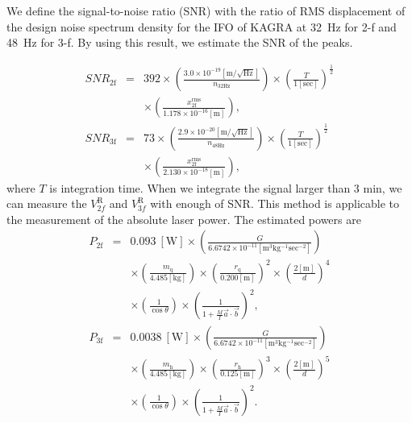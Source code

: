 \documentclass[%
 reprint,
superscriptaddress,
 amsmath,amssymb,
 aps,
]{revtex4-1}
\begin{document}
We define the signal-to-noise ratio (SNR) with the ratio of RMS displacement of the design noise spectrum density for the IFO of KAGRA at 32~Hz for 2-f and 48~Hz for 3-f.
By using this result, we estimate the SNR of the peaks.

\footnotesize
\begin{eqnarray}
\!S\!N\!R_{\mathrm{2f}}&=&392 \times \left(\frac{3.0 \times 10^{-19} [\mathrm{m/\sqrt{Hz}}]}{n_{\mathrm{32Hz}}} \right)  \times \left(\frac{T}{1 [\mathrm{sec}]} \right)^{\frac{1}{2}} \nonumber \\
 &&\times \left(\frac{x_{\mathrm{2f}}^{\mathrm{rms}}}{1.178 \times 10^{-16}\mathrm{[m]} }  \right),   \\
\!S\!N\!R_{\mathrm{3f}}&=&73 \times \left(\frac{2.9 \times 10^{-20} [\mathrm{m/\sqrt{Hz}}]}{n_{\mathrm{48Hz}}} \right) \times \left(\frac{T}{1 [\mathrm{sec}]} \right)^{\frac{1}{2}}  \nonumber \\ 
&&\times \left(\frac{x_{\mathrm{2f}}^{\mathrm{rms}}}{2.130 \times 10^{-18}\mathrm{[m] }} \right),
\end{eqnarray}
\normalsize
where $T$ is integration time. When we integrate the signal larger than 3 min, we can measure the $V^{\mathrm{R}}_{2f}$ and $V^{\mathrm{R}}_{3f}$ with enough of SNR.
This method is applicable to the measurement of the absolute laser power. The estimated powers are
\footnotesize
\begin{eqnarray}
P_{\mathrm{2f}}&=&0.093 ~\mathrm{[W]}\times \left( \frac{G}{6.6742 \times 10^{-11} \mathrm{[m^3kg^{-1}sec^{-2}]}} \right) \nonumber \\
&& \times \left( \frac{m_{\mathrm{q}}}{4.485 \mathrm{[kg]}} \right) \times \left( \frac{r_{\mathrm{q}}}{0.200 \mathrm{[m]}} \right)^2 \times \left( \frac{2\mathrm{[m]}}{d} \right)^4 \nonumber \\ &&\times \left( \frac{1}{\cos{\theta}} \right) \times \left( \frac{1}{1+\frac{M}{I}\vec{a}\cdot \vec{b}} \right)^2,\\
P_{\mathrm{3f}}&=&0.0038~\mathrm{[W]} \times \left( \frac{G}{6.6742 \times 10^{-11} \mathrm{[m^3kg^{-1}sec^{-2}]}} \right) \nonumber \\
&& \times \left( \frac{m_{\mathrm{h}}}{4.485 \mathrm{[kg]}} \right) \times \left( \frac{r_{\mathrm{h}}}{0.125 \mathrm{[m]}} \right)^3 \times \left( \frac{2\mathrm{[m]}}{d} \right)^5 \nonumber \\ &&\times \left( \frac{1}{\cos{\theta}} \right) \times \left( \frac{1}{1+\frac{M}{I}\vec{a}\cdot \vec{b}} \right)^2.
\end{eqnarray}
\end{document}
